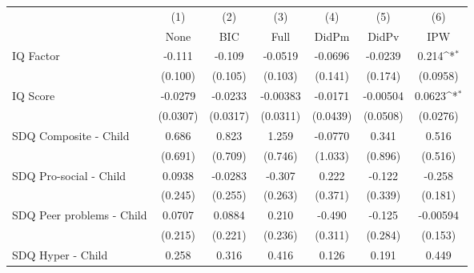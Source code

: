 {
\def\sym#1{\ifmmode^{#1}\else\(^{#1}\)\fi}
\begin{tabular}{l*{6}{c}}
\toprule
            &\multicolumn{1}{c}{(1)}&\multicolumn{1}{c}{(2)}&\multicolumn{1}{c}{(3)}&\multicolumn{1}{c}{(4)}&\multicolumn{1}{c}{(5)}&\multicolumn{1}{c}{(6)}\\
            &\multicolumn{1}{c}{None}&\multicolumn{1}{c}{BIC}&\multicolumn{1}{c}{Full}&\multicolumn{1}{c}{DidPm}&\multicolumn{1}{c}{DidPv}&\multicolumn{1}{c}{IPW}\\
\midrule
IQ Factor   &      -0.111         &      -0.109         &     -0.0519         &     -0.0696         &     -0.0239         &       0.214\sym{*}  \\
            &     (0.100)         &     (0.105)         &     (0.103)         &     (0.141)         &     (0.174)         &    (0.0958)         \\
\addlinespace
IQ Score    &     -0.0279         &     -0.0233         &    -0.00383         &     -0.0171         &    -0.00504         &      0.0623\sym{*}  \\
            &    (0.0307)         &    (0.0317)         &    (0.0311)         &    (0.0439)         &    (0.0508)         &    (0.0276)         \\
\addlinespace
SDQ Composite - Child&       0.686         &       0.823         &       1.259         &     -0.0770         &       0.341         &       0.516         \\
            &     (0.691)         &     (0.709)         &     (0.746)         &     (1.033)         &     (0.896)         &     (0.516)         \\
\addlinespace
SDQ Pro-social - Child&      0.0938         &     -0.0283         &      -0.307         &       0.222         &      -0.122         &      -0.258         \\
            &     (0.245)         &     (0.255)         &     (0.263)         &     (0.371)         &     (0.339)         &     (0.181)         \\
\addlinespace
SDQ Peer problems - Child&      0.0707         &      0.0884         &       0.210         &      -0.490         &      -0.125         &    -0.00594         \\
            &     (0.215)         &     (0.221)         &     (0.236)         &     (0.311)         &     (0.284)         &     (0.153)         \\
\addlinespace
SDQ Hyper - Child&       0.258         &       0.316         &       0.416         &       0.126         &       0.191         &       0.449         \\

\end{tabular}}
